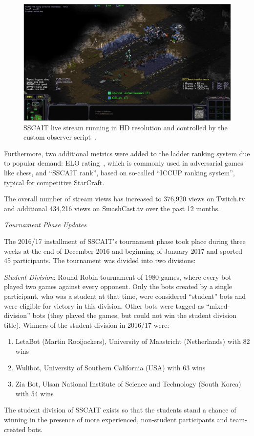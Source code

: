 \begin{figure}[t]
  \centering
  \includegraphics[width=1\columnwidth]{fig/sscait-stream.png}
  \caption{SSCAIT live stream running in HD resolution and controlled by the custom observer script~\cite{mattsson2015automatic}.}
  \label{figSSCAITstream}
\end{figure}

Furthermore, two additional metrics were added to the ladder ranking system due to popular demand: ELO rating~\cite{elo1978rating}, which is commonly used in adversarial games like chess, and ``SSCAIT rank'', based on so-called ``ICCUP ranking system'', typical for competitive StarCraft.

The overall number of stream views has increased to 376,920 views on Twitch.tv and additional 434,216 views on SmashCast.tv over the past 12 months. 

\begin{center}
\emph{Tournament Phase Updates} 
\end{center}

\noindent The 2016/17 installment of SSCAIT's tournament phase took place during three weeks at the end of December 2016 and beginning of January 2017 and sported 45 participants. The tournament was divided into two divisions:

\emph{Student Division}: Round Robin tournament of 1980 games, where every bot played two games against every opponent. Only the bots created by a single participant, who was a student at that time, were considered ``student'' bots and were eligible for victory in this division. Other bots were tagged as ``mixed-division'' bots (they played the games, but could not win the student division title). Winners of the student division in 2016/17 were:
  \begin{enumerate}
	\item LetaBot (Martin Rooijackers), University of Maastricht (Netherlands) with 82 wins
	\item Wulibot, University of Southern California (USA) with 63 wins
	\item Zia Bot, Ulsan National Institute of Science and Technology (South Korea) with 54 wins
  \end{enumerate}
The student division of SSCAIT exists so that the students stand a chance of winning in the presence of more experienced, non-student participants and team-created bots.

